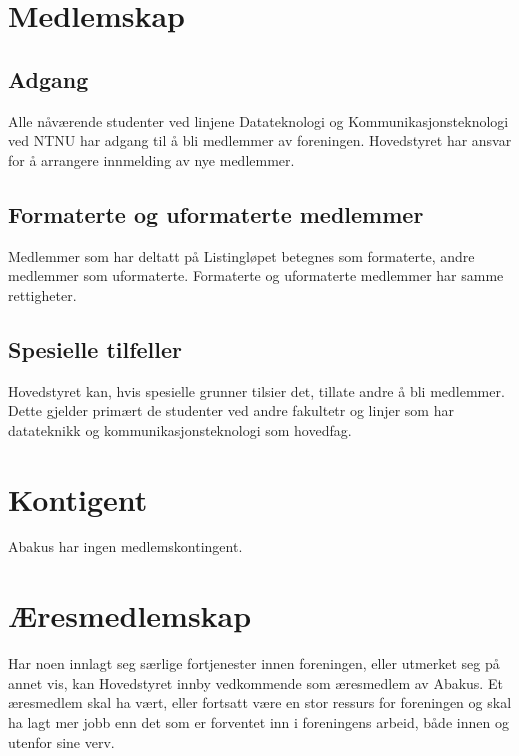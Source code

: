 \section{Medlemskap}

\subsection{Adgang}
Alle nåværende studenter ved linjene Datateknologi og Kommunikasjonsteknologi
ved NTNU har adgang til å bli medlemmer av foreningen. Hovedstyret har ansvar
for å arrangere innmelding av nye medlemmer.

\subsection{Formaterte og uformaterte medlemmer}
Medlemmer som har deltatt på Listingløpet betegnes som formaterte, andre
medlemmer som uformaterte. Formaterte og uformaterte medlemmer har samme
rettigheter.

\subsection{Spesielle tilfeller}
Hovedstyret kan, hvis spesielle grunner tilsier det, tillate andre å bli
medlemmer. Dette gjelder primært de studenter ved andre fakultetr og linjer
som har datateknikk og kommunikasjonsteknologi som hovedfag.

\section{Kontigent}
Abakus har ingen medlemskontingent.

\section{Æresmedlemskap}
Har noen innlagt seg særlige fortjenester innen foreningen, eller utmerket seg
på annet vis, kan Hovedstyret innby vedkommende som æresmedlem av Abakus. Et
æresmedlem skal ha vært, eller fortsatt være en stor ressurs for foreningen og
skal ha lagt mer jobb enn det som er forventet inn i foreningens arbeid, både
innen og utenfor sine verv.

